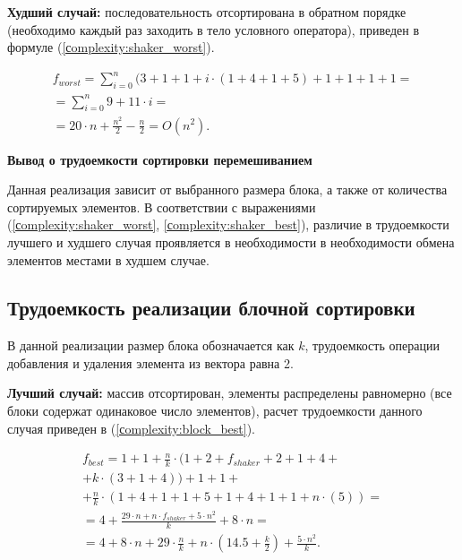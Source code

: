\textbf{Худший случай:} последовательность отсортирована в обратном порядке (необходимо каждый раз заходить в тело условного оператора), приведен в формуле (\ref{сomplexity:shaker_worst}).

\begin{equation}
	\label{сomplexity:shaker_worst}
	\begin{gathered}
		f_{worst} = \sum_{i=0}^{n}  (3 +  1 + 1 + i \cdot (1 +4  + 1 + 5) + 1 +1 +1 +1 = \\ = \sum_{i=0}^{n} 9 + 11 \cdot i = \\
		= 20 \cdot n + \frac{n^2}{2} - \frac{n}{2} = O(n^2).
	\end{gathered}
\end{equation}


\textbf{Вывод о  трудоемкости сортировки перемешиванием}

Данная реализация зависит от выбранного размера блока, а также от количества сортируемых элементов. В соответствии с выражениями (\ref{сomplexity:shaker_worst}, \ref{сomplexity:shaker_best}), различие в трудоемкости лучшего и худшего случая проявляется в необходимости в необходимости обмена элементов местами в худшем случае.



\subsection{Трудоемкость реализации блочной сортировки}
В данной реализации размер блока обозначается как $k$, трудоемкость операции добавления и удаления элемента из вектора равна 2.


\textbf{Лучший случай:} массив отсортирован, элементы распределены равномерно (все блоки содержат одинаковое число элементов), расчет трудоемкости данного случая приведен в (\ref{сomplexity:block_best}).


\begin{equation}
	\label{сomplexity:block_best}
	\begin{gathered}
		f_{best} = 1 +1 + \frac{n}{k} \cdot(1 + 2+f_{shaker} + 2 + 1 + 4 + \\
		+ k \cdot (3 + 1 + 4)) + 1 + 1 + \\
		+ \frac{n}{k} \cdot (1 + 4 + 1 + 1 + 5 + 1 + 4 + 1 + 1 + n \cdot (5)) = \\
		= 4 + \frac{29\cdot n + n \cdot f_{shaker} + 5 \cdot n^2}{k}  + 8 \cdot n  = \\
		= 4 + 8 \cdot n + 29 \cdot \frac{n}{k} + n \cdot (14.5 + \frac{k}{2}) + \frac{5 \cdot n^2}{k}.
	\end{gathered}
\end{equation}




